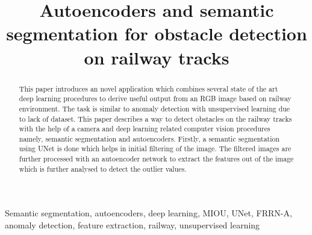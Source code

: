 \documentclass[conference]{IEEEtran}
\begin{document}
\title{Autoencoders and semantic segmentation for obstacle detection on railway tracks}

\author{
\and
{}
\and
{}
}

\maketitle

\begin{abstract}
This paper introduces an novel application which combines several state of the art deep learning procedures to derive useful output from an RGB image based on railway environment. The task is similar to anomaly detection with unsupervised learning due to lack of dataset. This paper describes a way to detect obstacles on the railway tracks with the help of a camera and deep learning related computer vision procedures namely, semantic segmentation and autoencoders. Firstly, a semantic segmentation using UNet \cite{ronneberger2015unet} is done which helps in initial filtering of the image. The filtered images are further processed with an autoencoder network to extract the features out of the image which is further analysed to detect the outlier values.  
\end{abstract}

\begin{IEEEkeywords}
\raggedright Semantic segmentation, autoencoders, deep learning, MIOU, UNet, FRRN-A, anomaly detection, feature extraction, railway, unsupervised learning
\end{IEEEkeywords}
\end{document}
